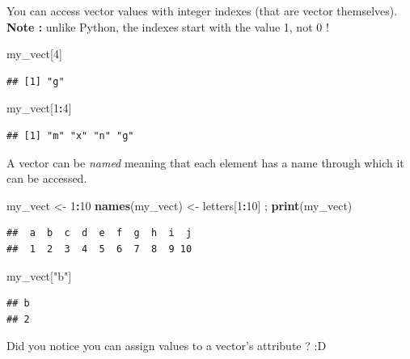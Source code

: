 \documentclass[
]{book}
\newenvironment{Shaded}{\begin{snugshade}}{\end{snugshade}}
\newcommand{\DecValTok}[1]{\textcolor[rgb]{0.00,0.00,0.81}{#1}}
\newcommand{\KeywordTok}[1]{\textcolor[rgb]{0.13,0.29,0.53}{\textbf{#1}}}
\newcommand{\NormalTok}[1]{#1}
\newcommand{\OperatorTok}[1]{\textcolor[rgb]{0.81,0.36,0.00}{\textbf{#1}}}
\newcommand{\StringTok}[1]{\textcolor[rgb]{0.31,0.60,0.02}{#1}}
\begin{document}
You can access vector values with integer indexes (that are vector themselves). \textbf{Note :} unlike Python, the indexes start with the value 1, not 0 !

\begin{Shaded}
\begin{Highlighting}[]
\NormalTok{my_vect[}\DecValTok{4}\NormalTok{]}
\end{Highlighting}
\end{Shaded}

\begin{verbatim}
## [1] "g"
\end{verbatim}

\begin{Shaded}
\begin{Highlighting}[]
\NormalTok{my_vect[}\DecValTok{1}\OperatorTok{:}\DecValTok{4}\NormalTok{]}
\end{Highlighting}
\end{Shaded}

\begin{verbatim}
## [1] "m" "x" "n" "g"
\end{verbatim}

A vector can be \emph{named} meaning that each element has a name through which it can be accessed.

\begin{Shaded}
\begin{Highlighting}[]
\NormalTok{my_vect <-}\StringTok{ }\DecValTok{1}\OperatorTok{:}\DecValTok{10}
\KeywordTok{names}\NormalTok{(my_vect) <-}\StringTok{ }\NormalTok{letters[}\DecValTok{1}\OperatorTok{:}\DecValTok{10}\NormalTok{] ; }\KeywordTok{print}\NormalTok{(my_vect)}
\end{Highlighting}
\end{Shaded}

\begin{verbatim}
##  a  b  c  d  e  f  g  h  i  j 
##  1  2  3  4  5  6  7  8  9 10
\end{verbatim}

\begin{Shaded}
\begin{Highlighting}[]
\NormalTok{my_vect[}\StringTok{"b"}\NormalTok{]}
\end{Highlighting}
\end{Shaded}

\begin{verbatim}
## b 
## 2
\end{verbatim}

Did you notice you can assign values to a vector's attribute ? :D
\end{document}
